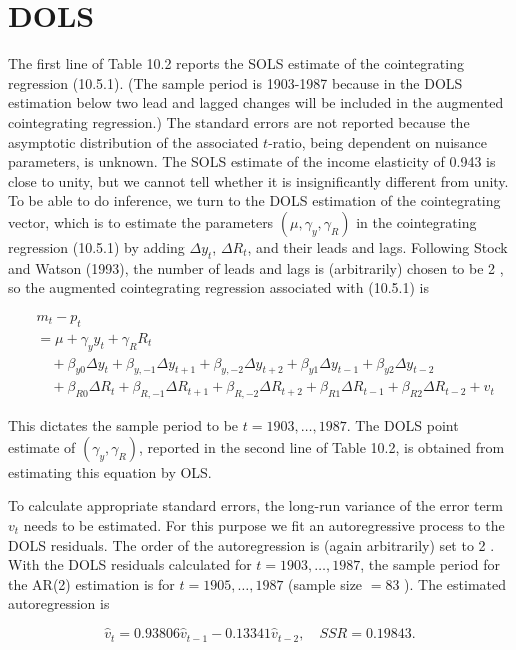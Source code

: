 \documentclass[10pt]{article}
\begin{document}
\section*{DOLS}
The first line of Table 10.2 reports the SOLS estimate of the cointegrating regression (10.5.1). (The sample period is 1903-1987 because in the DOLS estimation below two lead and lagged changes will be included in the augmented cointegrating regression.) The standard errors are not reported because the asymptotic distribution of the associated $t$-ratio, being dependent on nuisance parameters, is unknown. The SOLS estimate of the income elasticity of 0.943 is close to unity, but we cannot tell whether it is insignificantly different from unity. To be able to do inference, we turn to the DOLS estimation of the cointegrating vector, which is to estimate the parameters $\left(\mu, \gamma_{y}, \gamma_{R}\right)$ in the cointegrating regression (10.5.1) by adding $\Delta y_{t}$, $\Delta R_{t}$, and their leads and lags. Following Stock and Watson (1993), the number of leads and lags is (arbitrarily) chosen to be 2 , so the augmented cointegrating regression associated with (10.5.1) is


\begin{align*}
& m_{t}-p_{t} \\
& =\mu+\gamma_{y} y_{t}+\gamma_{R} R_{t} \\
& \quad+\beta_{y 0} \Delta y_{t}+\beta_{y,-1} \Delta y_{t+1}+\beta_{y,-2} \Delta y_{t+2}+\beta_{y 1} \Delta y_{t-1}+\beta_{y 2} \Delta y_{t-2} \\
& \quad+\beta_{R 0} \Delta R_{t}+\beta_{R,-1} \Delta R_{t+1}+\beta_{R,-2} \Delta R_{t+2}+\beta_{R 1} \Delta R_{t-1}+\beta_{R 2} \Delta R_{t-2}+v_{t} \tag{10.5.2}
\end{align*}


This dictates the sample period to be $t=1903, \ldots, 1987$. The DOLS point estimate of $\left(\gamma_{y}, \gamma_{R}\right)$, reported in the second line of Table 10.2, is obtained from estimating this equation by OLS.

To calculate appropriate standard errors, the long-run variance of the error term $v_{t}$ needs to be estimated. For this purpose we fit an autoregressive process to the DOLS residuals. The order of the autoregression is (again arbitrarily) set to 2 . With the DOLS residuals calculated for $t=1903, \ldots, 1987$, the sample period for the AR(2) estimation is for $t=1905, \ldots, 1987$ (sample size $=83$ ). The estimated autoregression is


\begin{equation*}
\hat{v}_{t}=0.93806 \hat{v}_{t-1}-0.13341 \hat{v}_{t-2}, \quad S S R=0.19843 . \tag{10.5.3}
\end{equation*}
\end{document}
